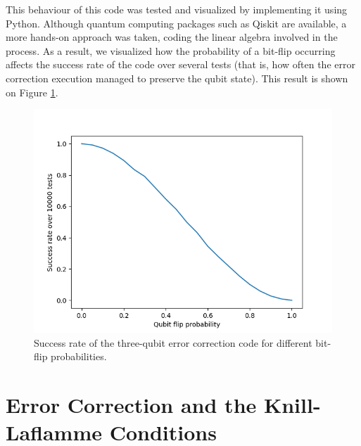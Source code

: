 This behaviour of this code was tested and visualized by implementing it using Python. Although quantum computing packages such as Qiskit are available, a more hands-on approach was taken, coding the linear algebra involved in the process. As a result, we visualized how the probability of a bit-flip occurring affects the success rate of the code over several tests (that is, how often the error correction execution managed to preserve the qubit state). This result is shown on Figure \ref{fig:three-qbit-code-success}.
\begin{figure}
    \centering
    \includegraphics[scale=0.6]{Success_rate.png}
    \caption{Success rate of the three-qubit error correction code for different bit-flip probabilities.}
    \label{fig:three-qbit-code-success}
\end{figure}

\section{Error Correction and the Knill-Laflamme Conditions}

